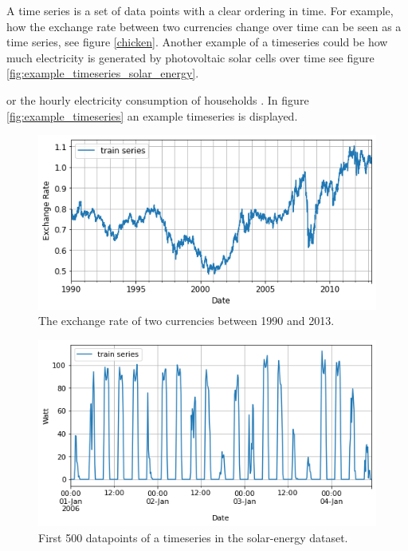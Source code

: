 


\graphicspath{{2_background/figures/}}
A time series is a set of data points with a clear ordering in time. For example, how the exchange rate between two currencies change over time can be seen as a time series, see figure \ref{chicken}. Another example of a timeseries could be how much electricity is generated by photovoltaic solar cells over time see figure \ref{fig:example_timeseries_solar_energy}.

or the hourly electricity consumption of households \cite{gluonts_paper}. In figure \ref{fig:example_timeseries} an example timeseries is displayed. 

\begin{figure}[htb]
    \centering
        \includegraphics[width=\linewidth]{2_background/figures/exchange_rate_example.png}
            \caption{The exchange rate of two currencies between 1990 and 2013.}
    \endminipage\hfill
\end{figure}
\label{chicken}

\begin{figure}[htb]
    \centering
        \includegraphics[width=\linewidth]{2_background/figures/solar_energy_zoomed_timeseries_3.png}
        \caption{First 500 datapoints of a timeseries in the solar-energy dataset.}
    \endminipage\hfill
\end{figure}
\label{fig:example_timeseries_solar_energy}

